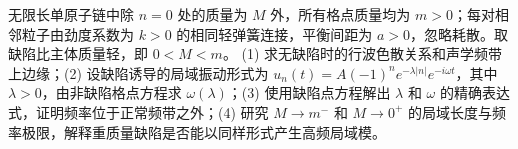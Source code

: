 无限长单原子链中除 \(n=0\) 处的质量为 \(M\) 外，所有格点质量均为 \(m>0\)；每对相邻粒子由劲度系数为 \(k>0\) 的相同轻弹簧连接，平衡间距为 \(a>0\)，忽略耗散。取缺陷比主体质量轻，即 \(0<M<m\)。
(1) 求无缺陷时的行波色散关系和声学频带上边缘；(2) 设缺陷诱导的局域振动形式为 \(u_n(t)=A(-1)^n e^{-\lambda|n|}e^{-i\omega t}\)，其中 \(\lambda>0\)，由非缺陷格点方程求 \(\omega(\lambda)\)；(3) 使用缺陷点方程解出 \(\lambda\) 和 \(\omega\) 的精确表达式，证明频率位于正常频带之外；(4) 研究 \(M\to m^-\) 和 \(M\to0^+\) 的局域长度与频率极限，解释重质量缺陷是否能以同样形式产生高频局域模。
